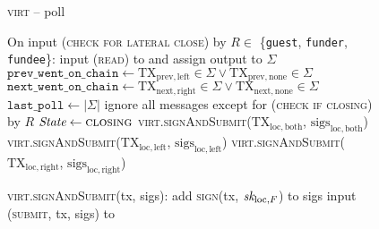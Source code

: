 \begin{figure}[H]
  \begin{processbox}{\textsc{virt} -- poll}
    \begin{algorithmic}[1]
      \State On input (\textsc{check for lateral close}) by $R \in$
      \{\texttt{guest}, \texttt{funder}, \texttt{fundee}\}:
      \Indent
        \State input (\textsc{read}) to \ledger and assign output to $\Sigma$
        \State $\texttt{prev\_went\_on\_chain} \gets \mathrm{TX}_{\mathrm{prev},
        \mathrm{left}} \in \Sigma \vee \mathrm{TX}_{\mathrm{prev},
        \mathrm{none}} \in \Sigma$
        \State $\texttt{next\_went\_on\_chain} \gets \mathrm{TX}_{\mathrm{next},
        \mathrm{right}} \in \Sigma \vee \mathrm{TX}_{\mathrm{next},
        \mathrm{none}} \in \Sigma$
        \State $\texttt{last\_poll} \gets |\Sigma|$
          \State ignore all messages except for (\textsc{check if closing}) by
          $R$
          \State $\textit{State} \gets \textsc{closing}$
        \EndIf
          \State
          \textsc{virt}.\textsc{signAndSubmit}($\mathrm{TX}_{\mathrm{loc},
          \mathrm{both}}$, $\mathrm{sigs}_{\mathrm{loc}, \mathrm{both}}$)
          \State
          \textsc{virt}.\textsc{signAndSubmit}($\mathrm{TX}_{\mathrm{loc},
          \mathrm{left}}$, $\mathrm{sigs}_{\mathrm{loc}, \mathrm{left}}$)
          \State
          \textsc{virt}.\textsc{signAndSubmit}($\mathrm{TX}_{\mathrm{loc},
          \mathrm{right}}$, $\mathrm{sigs}_{\mathrm{loc}, \mathrm{right}}$)
        \EndIf
      \EndIndent
      \Statex

      \State \textsc{virt}.\textsc{signAndSubmit}(tx, sigs):
      \Indent
        \State add \textsc{sign}(tx, $\textit{sk}_{\mathrm{loc}, F}$) to sigs
        \State input (\textsc{submit}, tx, sigs) to \ledger
      \EndIndent
    \end{algorithmic}
  \end{processbox}
  \caption{}
  \label{code:virtual-layer:poll}
\end{figure}

